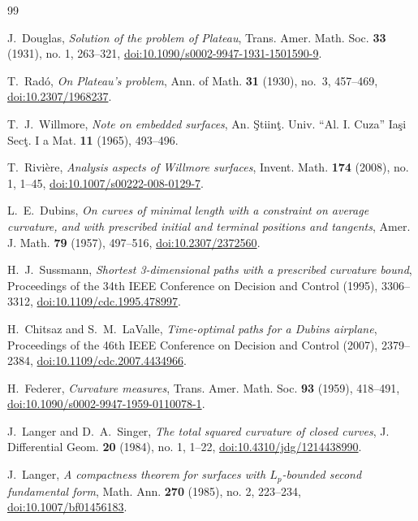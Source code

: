 \documentclass[11pt,reqno]{amsart}
\theoremstyle{definition}
\numberwithin{equation}{section}
\begin{document}
\begin{thebibliography}{99}

J.~Douglas,
\emph{Solution of the problem of Plateau},
Trans. Amer. Math. Soc. \textbf{33} (1931), no. 1, 263--321, \href{https://doi.org/10.1090/s0002-9947-1931-1501590-9}{doi:10.1090/s0002-9947-1931-1501590-9}.

T.~Rad\'o,
\emph{On Plateau's problem},
Ann. of Math. \textbf{31} (1930), no.~3, 457--469, \href{https://doi.org/10.2307/1968237}{doi:10.2307/1968237}.

T.~J.~Willmore,
\emph{Note on embedded surfaces},
An. \c{S}tiin\c{t}. Univ. ``Al. I. Cuza'' Ia\c{s}i Sec\c{t}. I a Mat. \textbf{11} (1965), 493--496.

T.~Rivi\`ere,
\emph{Analysis aspects of Willmore surfaces},
Invent. Math. \textbf{174} (2008), no. 1, 1--45, \href{https://doi.org/10.1007/s00222-008-0129-7}{doi:10.1007/s00222-008-0129-7}.

L.~E.~Dubins,
\emph{On curves of minimal length with a constraint on average curvature, and with prescribed initial and terminal positions and tangents},
Amer. J. Math. \textbf{79} (1957), 497--516, \href{https://doi.org/10.2307/2372560}{doi:10.2307/2372560}.

H.~J.~Sussmann,
\emph{Shortest 3-dimensional paths with a prescribed curvature bound},
Proceedings of the 34th IEEE Conference on Decision and Control (1995), 3306--3312, \href{https://doi.org/10.1109/cdc.1995.478997}{doi:10.1109/cdc.1995.478997}.

H.~Chitsaz and S.~M.~LaValle,
\emph{Time-optimal paths for a Dubins airplane},
Proceedings of the 46th IEEE Conference on Decision and Control (2007), 2379--2384, \href{https://doi.org/10.1109/cdc.2007.4434966}{doi:10.1109/cdc.2007.4434966}.

H.~Federer,
\emph{Curvature measures},
Trans. Amer. Math. Soc. \textbf{93} (1959), 418--491, \href{https://doi.org/10.1090/s0002-9947-1959-0110078-1}{doi:10.1090/s0002-9947-1959-0110078-1}.

J.~Langer and D.~A.~Singer,
\emph{The total squared curvature of closed curves},
J. Differential Geom. \textbf{20} (1984), no. 1, 1--22, \href{https://doi.org/10.4310/jdg/1214438990}{doi:10.4310/jdg/1214438990}.

J.~Langer,
\emph{A compactness theorem for surfaces with $L_p$-bounded second fundamental form},
Math. Ann. \textbf{270} (1985), no. 2, 223--234, \href{https://doi.org/10.1007/bf01456183}{doi:10.1007/bf01456183}.


\end{thebibliography}
\end{document}
